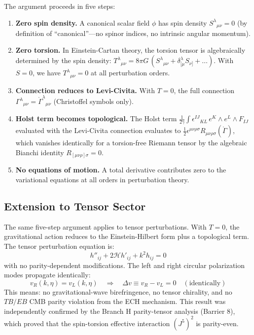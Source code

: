 \documentclass[aps,prd,twocolumn,superscriptaddress,showpacs,preprintnumbers,nofootinbib,longbibliography,floatfix]{revtex4-2}
\begin{document}
The argument proceeds in five steps:

\begin{enumerate}
\item \textbf{Zero spin density.} A canonical scalar field $\phi$ has spin density $S^\lambda{}_{\mu\nu} = 0$ (by definition of ``canonical''---no spinor indices, no intrinsic angular momentum).

\item \textbf{Zero torsion.} In Einstein-Cartan theory, the torsion tensor is algebraically determined by the spin density: $T^\lambda{}_{\mu\nu} = 8\pi G\, (S^\lambda{}_{\mu\nu} + \delta^\lambda_{[\mu} S_{\nu]} + \ldots)$. With $S = 0$, we have $T^\lambda{}_{\mu\nu} = 0$ at all perturbation orders.

\item \textbf{Connection reduces to Levi-Civita.} With $T = 0$, the full connection $\Gamma^\lambda{}_{\mu\nu} = \mathring{\Gamma}^\lambda{}_{\mu\nu}$ (Christoffel symbols only).

\item \textbf{Holst term becomes topological.} The Holst term $\frac{1}{2\gamma}\int \epsilon^{IJ}{}_{KL}\, e^K \wedge e^L \wedge F_{IJ}$ evaluated with the Levi-Civita connection evaluates to $\frac{1}{2}\epsilon^{\mu\nu\rho\sigma}R_{\mu\nu\rho\sigma}(\mathring{\Gamma})$, which vanishes identically for a torsion-free Riemann tensor by the algebraic Bianchi identity $R_{[\mu\nu\rho]\sigma} = 0$.

\item \textbf{No equations of motion.} A total derivative contributes zero to the variational equations at all orders in perturbation theory.
\end{enumerate}

\subsection{Extension to Tensor Sector}

The same five-step argument applies to tensor perturbations. With $T = 0$, the gravitational action reduces to the Einstein-Hilbert form plus a topological term. The tensor perturbation equation is:
\begin{equation}
h''_{ij} + 2\mathcal{H}h'_{ij} + k^2 h_{ij} = 0
\end{equation}
with no parity-dependent modifications. The left and right circular polarization modes propagate identically:
\begin{equation}
v_R(k,\eta) = v_L(k,\eta) \quad \Rightarrow \quad \Delta v \equiv v_R - v_L = 0 \quad (\text{identically})
\end{equation}
This means: no gravitational-wave birefringence, no tensor chirality, and no $TB/EB$ CMB parity violation from the ECH mechanism. This result was independently confirmed by the Branch H parity-tensor analysis (Barrier 8), which proved that the spin-torsion effective interaction $(J^5)^2$ is parity-even.
\end{document}
